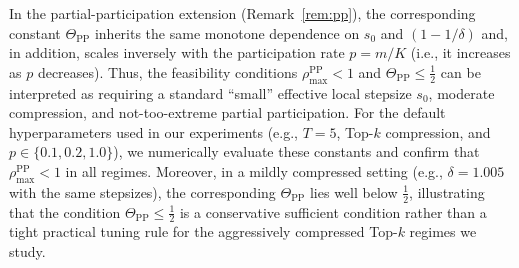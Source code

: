 \documentclass{article} %
\newtheorem{lemma}{Lemma}
\begin{document}
In the partial-participation extension (Remark~\ref{rem:pp}), the corresponding constant $\Theta_{\mathrm{PP}}$ inherits the same monotone dependence on $s_0$ and $(1-1/\delta)$ and, in addition, scales inversely with the participation rate $p = m/K$ (i.e., it increases as $p$ decreases). Thus, the feasibility conditions $\rho_{\max}^{\mathrm{PP}} < 1$ and $\Theta_{\mathrm{PP}} \le \tfrac12$ can be interpreted as requiring a standard “small” effective local stepsize $s_0$, moderate compression, and not-too-extreme partial participation. For the default hyperparameters used in our experiments (e.g., $T=5$, Top-$k$ compression, and $p \in \{0.1,0.2,1.0\}$), we numerically evaluate these constants and confirm that $\rho_{\max}^{\mathrm{PP}} < 1$ in all regimes. Moreover, in a mildly compressed setting (e.g., $\delta = 1.005$ with the same stepsizes), the corresponding $\Theta_{\mathrm{PP}}$ lies well below $\tfrac12$, illustrating that the condition $\Theta_{\mathrm{PP}} \le \tfrac12$ is a conservative sufficient condition rather than a tight practical tuning rule for the aggressively compressed Top-$k$ regimes we study.





\end{document}
